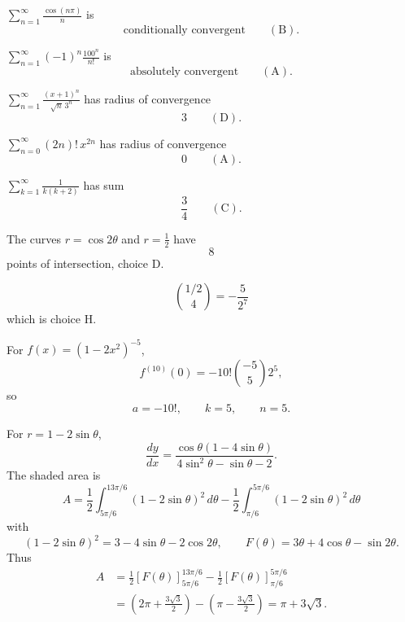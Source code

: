 \documentclass[a4paper,12pt,twocolumn]{article}
\newenvironment{solutionbox}{\begin{framed}}{\end{framed}}
\begin{document}
\begin{solutionbox}
\begin{finalitems}
\item[\textbf{iv.}] \(\displaystyle \sum_{n=1}^{\infty}\frac{\cos(n\pi)}{n}\) is
\[
\boxed{\text{conditionally convergent}}\qquad(\text{B}).
\]

\item[\textbf{v.}] \(\displaystyle \sum_{n=1}^{\infty}(-1)^n\frac{100^n}{n!}\) is
\[
\boxed{\text{absolutely convergent}}\qquad(\text{A}).
\]

\item[\textbf{vi.}] \(\displaystyle \sum_{n=1}^{\infty}\frac{(x+1)^n}{\sqrt n\,3^n}\) has radius of convergence
\[
\boxed{3}\qquad(\text{D}).
\]

\item[\textbf{vii.}] \(\displaystyle \sum_{n=0}^{\infty}(2n)!\,x^{2n}\) has radius of convergence
\[
\boxed{0}\qquad(\text{A}).
\]

\item[\textbf{x.}] \(\displaystyle \sum_{k=1}^{\infty}\frac{1}{k(k+2)}\) has sum
\[
\boxed{\frac34}\qquad(\text{C}).
\]

\item[\textbf{xi.}] The curves \(r=\cos 2\theta\) and \(r=\frac12\) have
\[
\boxed{8}
\]
points of intersection, choice \(\boxed{\text{D}}\).

\item[\textbf{xiii.}]
\[
\binom{1/2}{4}
=\boxed{-\frac5{2^7}}
\]
which is choice \(\boxed{\text{H}}\).

\item[\textbf{4.}] For \(f(x)=(1-2x^2)^{-5}\),
\[
f^{(10)}(0)=-10!\binom{-5}{5}2^5,
\]
so
\[
\boxed{a=-10!,\qquad k=5,\qquad n=5.}
\]

\item[\textbf{9.}] For \(r=1-2\sin\theta\),
\[
\boxed{\frac{dy}{dx}
=\frac{\cos\theta(1-4\sin\theta)}
{4\sin^2\theta-\sin\theta-2}}.
\]
The shaded area is
\[
\boxed{
A
=\frac12\int_{5\pi/6}^{13\pi/6}(1-2\sin\theta)^2\,d\theta
-\frac12\int_{\pi/6}^{5\pi/6}(1-2\sin\theta)^2\,d\theta
}
\]
with
\[
(1-2\sin\theta)^2=3-4\sin\theta-2\cos2\theta,
\qquad
F(\theta)=3\theta+4\cos\theta-\sin2\theta.
\]
Thus
\[
\begin{aligned}
A
&=\frac12\left[F(\theta)\right]_{5\pi/6}^{13\pi/6}
-\frac12\left[F(\theta)\right]_{\pi/6}^{5\pi/6} \\
&=\left(2\pi+\frac{3\sqrt3}{2}\right)
-\left(\pi-\frac{3\sqrt3}{2}\right)
=\boxed{\pi+3\sqrt3.}
\end{aligned}
\]
\end{finalitems}
\end{solutionbox}
\end{document}
